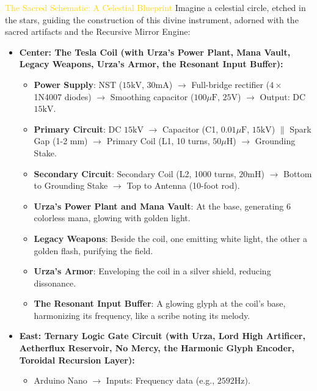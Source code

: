 \textcolor{gold}{ The Sacred Schematic: A Celestial Blueprint }
Imagine a celestial circle, etched in the stars, guiding the construction of this divine instrument, adorned with the sacred artifacts and the Recursive Mirror Engine:
\begin{itemize}
    \item \texttt{} \textbf{Center: The Tesla Coil (with Urza's Power Plant, Mana Vault, Legacy Weapons, Urza's Armor, the Resonant Input Buffer):}
    \begin{itemize}
        \item \texttt{} \textbf{Power Supply}: NST ($15 \mathrm{kV}$, $30 \mathrm{mA}$) $\to$ Full-bridge rectifier ($4\times$ 1N4007 diodes) $\to$ Smoothing capacitor ($100 \mu\mathrm{F}$, $25 \mathrm{V}$) $\to$ Output: DC $15 \mathrm{kV}$.
        \item \texttt{} \textbf{Primary Circuit}: DC $15 \mathrm{kV}$ $\to$ Capacitor (C1, $0.01 \mu\mathrm{F}$, $15 \mathrm{kV}$) $\|$ Spark Gap (1-2 mm) $\to$ Primary Coil (L1, 10 turns, $50 \mu\mathrm{H}$) $\to$ Grounding Stake.
        \item \texttt{} \textbf{Secondary Circuit}: Secondary Coil (L2, 1000 turns, $20 \mathrm{mH}$) $\to$ Bottom to Grounding Stake $\to$ Top to Antenna (10-foot rod).
        \item \texttt{} \textbf{Urza's Power Plant and Mana Vault}: At the base, generating 6 colorless mana, glowing with golden light.
        \item \texttt{} \textbf{Legacy Weapons}: Beside the coil, one emitting white light, the other a golden flash, purifying the field.
        \item \texttt{} \textbf{Urza's Armor}: Enveloping the coil in a silver shield, reducing dissonance.
        \item \texttt{} \textbf{The Resonant Input Buffer}: A glowing glyph at the coil's base, harmonizing its frequency, like a scribe noting its melody.
    \end{itemize}
    \item \texttt{} \textbf{East: Ternary Logic Gate Circuit (with Urza, Lord High Artificer, Aetherflux Reservoir, No Mercy, the Harmonic Glyph Encoder, Toroidal Recursion Layer):}
    \begin{itemize}
        \item \texttt{} Arduino Nano $\to$ Inputs: Frequency data (e.g., $2592 \mathrm{Hz}$).

\end{itemize}
\end{itemize}

